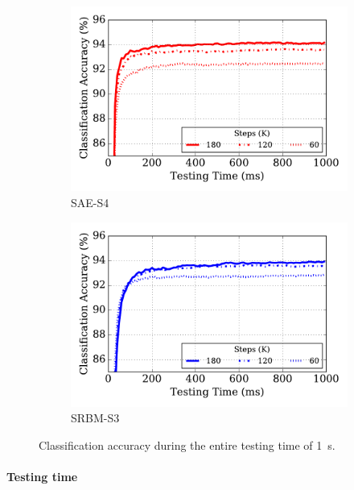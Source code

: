 \begin{figure}
	\centering
	\begin{subfigure}[t]{0.48\textwidth}
		\includegraphics[width=\textwidth]{pics_sdlm/43_MNIST_SAE_all/latency.pdf}
		\caption{SAE-S4}
	\end{subfigure}
	\begin{subfigure}[t]{0.48\textwidth}
		\includegraphics[width=\textwidth]{pics_sdlm/51_MNIST_SRBM_teach/latency.pdf}
		\caption{SRBM-S3}
	\end{subfigure}
	\caption[Classification accuracy per time step.]{Classification accuracy during the entire testing time of 1~s.}
	\label{fig:latency}
\end{figure}


	
\paragraph{Testing time\\}

